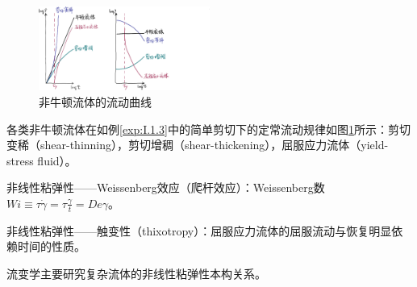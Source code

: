 \documentclass[main.tex]{subfiles}
\begin{document}
\begin{figure}[h]
\centering
\includegraphics[width=0.5\textwidth]{images/I.2.2.eps}
\caption{非牛顿流体的流动曲线}
\label{fig:I.2.2}
\end{figure}

\begin{example}[非线性]
各类非牛顿流体在如例\ref{exp:I.1.3}中的简单剪切下的定常流动规律如图\ref{fig:I.2.2}所示：剪切变稀（shear-thinning），剪切增稠（shear-thickening），屈服应力流体（yield-stress fluid）。
\end{example}

非线性粘弹性——Weissenberg效应（爬杆效应）：Weissenberg数$Wi\equiv\tau\dot{\gamma}=\tau\frac{\gamma}{t}=De\gamma$。

非线性粘弹性——触变性（thixotropy）：屈服应力流体的屈服流动与恢复明显依赖时间的性质。

流变学主要研究复杂流体的非线性粘弹性本构关系。
\end{document}
